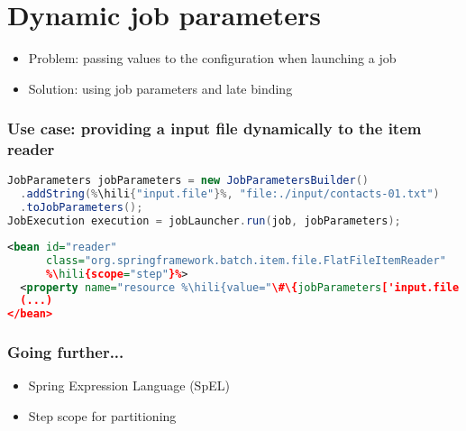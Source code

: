 \section{Dynamic job parameters}

\begin{frame}
 \begin{itemize}
  \item Problem: passing values to the configuration when launching a job
  \item Solution: using job parameters and late binding
 \end{itemize}
\end{frame}

\begin{frame}[fragile]
 \frametitle{Use case: providing a input file dynamically to the item reader}
 \begin{lstlisting}[language=Java]
JobParameters jobParameters = new JobParametersBuilder()
  .addString(%\hili{"input.file"}%, "file:./input/contacts-01.txt")
  .toJobParameters();
JobExecution execution = jobLauncher.run(job, jobParameters);
 \end{lstlisting}
 \begin{lstlisting}[language=XML]
<bean id="reader"
      class="org.springframework.batch.item.file.FlatFileItemReader"
      %\hili{scope="step"}%>
  <property name="resource %\hili{value="\#\{jobParameters['input.file']\}}%" />
  (...)
</bean>
 \end{lstlisting} 
\end{frame}

\begin{frame}
 \frametitle{Going further...}
 \begin{itemize}
  \item Spring Expression Language (SpEL)
  \item Step scope for partitioning  
 \end{itemize}
\end{frame}

